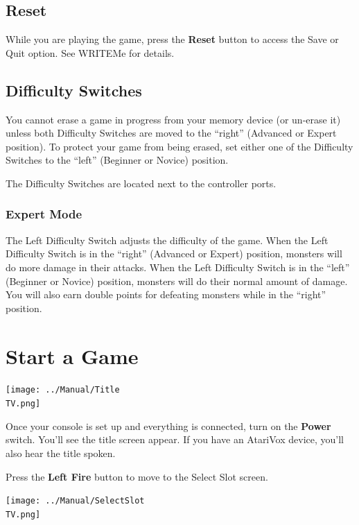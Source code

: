 \documentclass[10pt,twocolumn,openany,article]{memoir}
\newcommand\TV{NTSC}
\newcommand\TV{PAL}
\begin{document}
\subsection{Reset}

While  you are  playing the  game,  press the  \textbf{Reset} button  to
access the Save or Quit option. See WRITEMe for details.

\subsection{Difficulty Switches}

You cannot erase a game in progress from your memory device (or un-erase
it) unless both Difficulty Switches are moved to the ``right'' (Advanced
or Expert position). To protect your  game from being erased, set either
one  of   the  Difficulty   Switches  to   the  ``left''   (Beginner  or
Novice) position.

The Difficulty Switches are located next to the controller ports.

\subsubsection*{Expert Mode}

The Left Difficulty Switch adjusts the  difficulty of the game. When the
Left Difficulty  Switch is in  the ``right'' (Advanced or  Expert) position,
monsters will do more damage in  their attacks. When the Left Difficulty
Switch is in  the ``left'' (Beginner or Novice) position,  monsters will do
their normal  amount of  damage. You  will also  earn double  points for
defeating monsters while in the ``right'' position.

\section{Start a Game}

\begin{center}
  \texttt{[image: ../Manual/Title\\TV.png]}
\end{center}

Once your  console is set  up and everything  is connected, turn  on the
\textbf{Power} switch. You'll  see the title screen appear.  If you have
an AtariVox device, you'll also hear the title spoken.

Press the \textbf{Left Fire} button to move to the Select Slot screen.

\begin{center}
  \texttt{[image: ../Manual/SelectSlot\\TV.png]}
\end{center}
\end{document}
